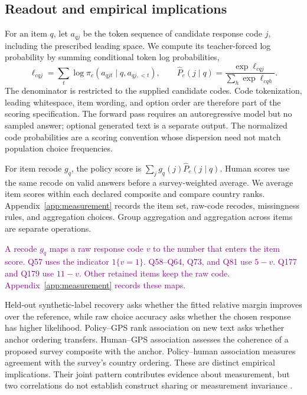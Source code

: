 \subsection{Readout and empirical implications}
For an item $q$, let $a_{qj}$ be the token sequence of candidate response code $j$, including the prescribed leading space. We compute its teacher-forced log probability by summing conditional token log probabilities,
\begin{equation}
\ell_{cqj}=\sum_t\log\widehat\pi_c(a_{qjt}\mid q,a_{qj,<t}),\qquad
\widehat P_c(j\mid q)=\frac{\exp\ell_{cqj}}{\sum_h\exp\ell_{cqh}}.
\label{eq:readout}
\end{equation}
The denominator is restricted to the supplied candidate codes. Code tokenization, leading whitespace, item wording, and option order are therefore part of the scoring specification. The forward pass requires an autoregressive model but no sampled answer; optional generated text is a separate output. The normalized code probabilities are a scoring convention whose dispersion need not match population choice frequencies.

For item recode $g_q$, the policy score is $\sum_jg_q(j)\widehat P_c(j\mid q)$. Human scores use the same recode on valid answers before a survey-weighted average. We average item scores within each declared composite and compare country ranks. Appendix~\ref{app:measurement} records the item set, raw-code recodes, missingness rules, and aggregation choices. Group aggregation and aggregation across items are separate operations.

\textcolor{purple}{A recode $g_q$ maps a raw response code $v$ to the number that enters the item score. Q57 uses the indicator $1\{v=1\}$. Q58--Q64, Q73, and Q81 use $5-v$. Q177 and Q179 use $11-v$. Other retained items keep the raw code. Appendix~\ref{app:measurement} records these maps.}

Held-out synthetic-label recovery asks whether the fitted relative margin improves over the reference, while raw choice accuracy asks whether the chosen response has higher likelihood. Policy--GPS rank association on new text asks whether anchor ordering transfers. Human--GPS association assesses the coherence of a proposed survey composite with the anchor. Policy--human association measures agreement with the survey's country ordering. These are distinct empirical implications. Their joint pattern contributes evidence about measurement, but two correlations do not establish construct sharing or measurement invariance \cite{campbellfiske1959,davidov2014,steenkamp1998}.

